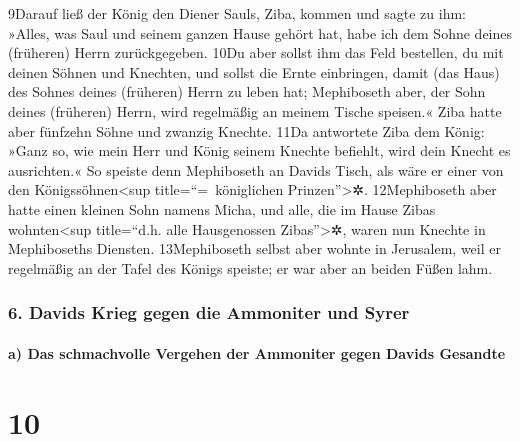 9Darauf ließ der König den Diener Sauls, Ziba, kommen und sagte zu ihm:
»Alles, was Saul und seinem ganzen Hause gehört hat, habe ich dem Sohne
deines (früheren) Herrn zurückgegeben. 10Du aber sollst ihm das Feld
bestellen, du mit deinen Söhnen und Knechten, und sollst die Ernte
einbringen, damit (das Haus) des Sohnes deines (früheren) Herrn zu leben
hat; Mephiboseth aber, der Sohn deines (früheren) Herrn, wird regelmäßig
an meinem Tische speisen.« Ziba hatte aber fünfzehn Söhne und zwanzig
Knechte. 11Da antwortete Ziba dem König: »Ganz so, wie mein Herr und
König seinem Knechte befiehlt, wird dein Knecht es ausrichten.« So
speiste denn Mephiboseth an Davids Tisch, als wäre er einer von den
Königssöhnen\textless sup title=``=~königlichen Prinzen''\textgreater✲.
12Mephiboseth aber hatte einen kleinen Sohn namens Micha, und alle, die
im Hause Zibas wohnten\textless sup title=``d.h. alle Hausgenossen
Zibas''\textgreater✲, waren nun Knechte in Mephiboseths Diensten.
13Mephiboseth selbst aber wohnte in Jerusalem, weil er regelmäßig an der
Tafel des Königs speiste; er war aber an beiden Füßen lahm.

\hypertarget{davids-krieg-gegen-die-ammoniter-und-syrer}{%
\subsubsection{6. Davids Krieg gegen die Ammoniter und
Syrer}\label{davids-krieg-gegen-die-ammoniter-und-syrer}}

\hypertarget{a-das-schmachvolle-vergehen-der-ammoniter-gegen-davids-gesandte}{%
\paragraph{a) Das schmachvolle Vergehen der Ammoniter gegen Davids
Gesandte}\label{a-das-schmachvolle-vergehen-der-ammoniter-gegen-davids-gesandte}}

\hypertarget{section-9}{%
\section{10}\label{section-9}}

